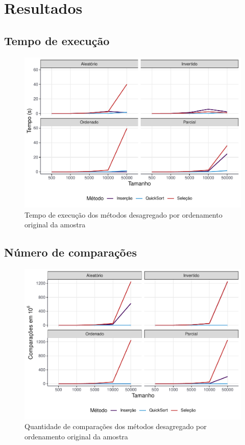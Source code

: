 \documentclass[
]{article}
\begin{document}
\hypertarget{resultados}{%
\section{Resultados}\label{resultados}}

\hypertarget{tempo-de-execuuxe7uxe3o}{%
\subsection{Tempo de execução}\label{tempo-de-execuuxe7uxe3o}}

\begin{figure}

{\centering \includegraphics[width=0.75\linewidth]{relatorio_tp1_files/figure-latex/grafico-tempo-1} 

}

\caption{Tempo de execução dos métodos desagregado por ordenamento original da amostra}\label{fig:grafico-tempo}
\end{figure}

\hypertarget{nuxfamero-de-comparauxe7uxf5es}{%
\subsection{Número de
comparações}\label{nuxfamero-de-comparauxe7uxf5es}}

\begin{figure}

{\centering \includegraphics[width=0.75\linewidth]{relatorio_tp1_files/figure-latex/grafico-comparacoes-1} 

}

\caption{Quantidade de comparações dos métodos desagregado por ordenamento original da amostra}\label{fig:grafico-comparacoes}
\end{figure}
\end{document}
